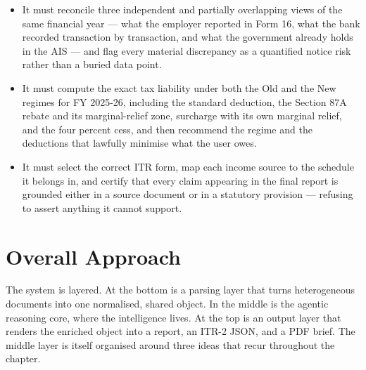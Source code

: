 \begin{itemize}
    \item It must reconcile three independent and partially overlapping views of
          the same financial year --- what the employer reported in Form 16,
          what the bank recorded transaction by transaction, and what the
          government already holds in the AIS --- and flag every material
          discrepancy as a quantified notice risk rather than a buried data
          point.
    \item It must compute the exact tax liability under both the Old and the New
          regimes for FY 2025-26, including the standard deduction, the Section
          87A rebate and its marginal-relief zone, surcharge with its own
          marginal relief, and the four percent cess, and then recommend the
          regime and the deductions that lawfully minimise what the user owes.
    \item It must select the correct ITR form, map each income source to the
          schedule it belongs in, and certify that every claim appearing in the
          final report is grounded either in a source document or in a statutory
          provision --- refusing to assert anything it cannot support.
\end{itemize}

\section{Overall Approach}
\label{sec:overall-approach}

The system is layered. At the bottom is a parsing layer that turns
heterogeneous documents into one normalised, shared object. In the middle is the
agentic reasoning core, where the intelligence lives. At the top is an output
layer that renders the enriched object into a report, an ITR-2 JSON, and a PDF
brief. The middle layer is itself organised around three ideas that recur
throughout the chapter.

